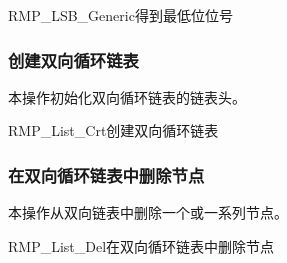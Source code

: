 \begin{apidesc}{RMP\_LSB\_Generic}{得到最低位位号}
    \begin{apiparams}
    \end{apiparams}
    \begin{apiret}
    \end{apiret}
\end{apidesc}

\subsubsection{创建双向循环链表}\label{subsubsec:create-a-doubly-linked-circular-list}

本操作初始化双向循环链表的链表头。

\begin{apidesc}{RMP\_List\_Crt}{创建双向循环链表}
    \begin{apiparams}
    \end{apiparams}
    \begin{apiret}
    \end{apiret}
\end{apidesc}

\subsubsection{在双向循环链表中删除节点}\label{subsubsec:delete-nodes-from-a-doubly-linked-circular-list}

本操作从双向链表中删除一个或一系列节点。

\begin{apidesc}{RMP\_List\_Del}{在双向循环链表中删除节点}
    \begin{apiparams}
    \end{apiparams}
    \begin{apiret}
    \end{apiret}
\end{apidesc}


